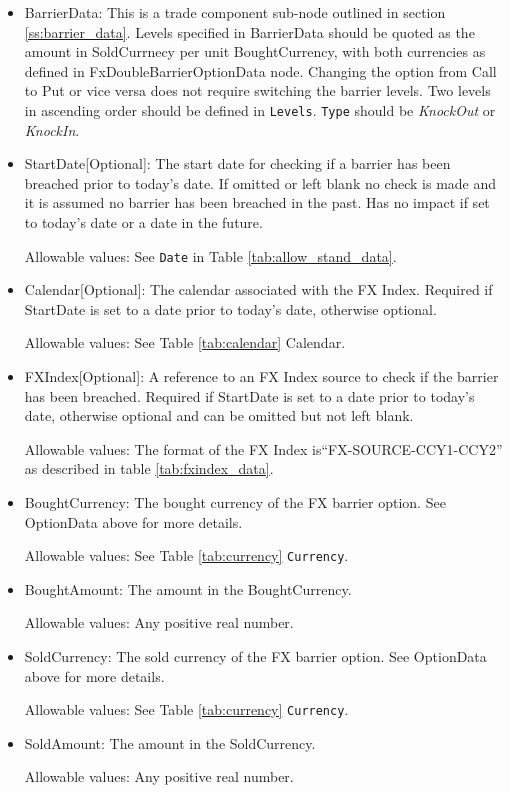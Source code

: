 \begin{itemize}
\begin{itemize}
\end{itemize}


\item BarrierData: This is a trade component sub-node outlined in section \ref{ss:barrier_data}.
Levels specified in BarrierData should be quoted as the amount in SoldCurrnecy per unit BoughtCurrency, with both currencies as defined in FxDoubleBarrierOptionData node.
Changing the option from Call to Put or vice versa does not require switching the barrier levels. Two levels in ascending order should be defined in \lstinline!Levels!. \lstinline!Type! should be \emph{KnockOut} or \emph{KnockIn}.

\item StartDate[Optional]: The start date for checking if a barrier has been breached prior to today's date.  If omitted or left blank no check is made and it is assumed no barrier has been breached in the past. Has no impact if set to today's date or a date in the future.

Allowable values:  See \lstinline!Date! in Table \ref{tab:allow_stand_data}.

\item Calendar[Optional]: The calendar associated with the FX Index. Required if StartDate is set to a date prior to today's date, otherwise optional.

Allowable values: See Table \ref{tab:calendar} Calendar.

\item FXIndex[Optional]: A reference to an FX Index source to check if the barrier has been breached. Required if StartDate is set to a date prior to today's date, otherwise optional and can be omitted but not left blank.

Allowable values:  The format of the FX Index is``FX-SOURCE-CCY1-CCY2'' as described in table \ref{tab:fxindex_data}. 

\item BoughtCurrency: The bought currency of the FX barrier option. See OptionData above for more details.

Allowable values:  See Table \ref{tab:currency} \lstinline!Currency!.

\item BoughtAmount: The amount in the BoughtCurrency.  

Allowable values:  Any positive real number.

\item SoldCurrency: The sold currency of the FX barrier option. See OptionData above for more details.

Allowable values:  See Table \ref{tab:currency} \lstinline!Currency!.

\item SoldAmount: The amount in the SoldCurrency.  

Allowable values:  Any positive real number.

\end{itemize}